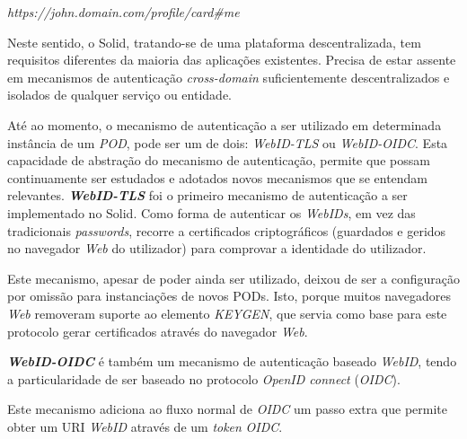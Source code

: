 \begin{center}
    \emph{https://john.domain.com/profile/card\#me}
\end{center}

Neste sentido, o Solid, tratando-se de uma plataforma descentralizada, tem requisitos diferentes da maioria das aplicações existentes. Precisa de estar assente em mecanismos de autenticação \emph{cross-domain} suficientemente descentralizados e isolados de qualquer serviço ou entidade\cite{solid_spec}.

Até ao momento, o mecanismo de autenticação a ser utilizado em determinada instância de um \emph{POD}, pode ser um de dois: \emph{WebID-TLS} ou \emph{WebID-OIDC}. Esta capacidade de abstração do mecanismo de autenticação, permite que possam continuamente ser estudados e adotados novos mecanismos que se entendam relevantes\cite{solid_spec}.
\newpara
\textbf{\emph{WebID-TLS}} foi o primeiro mecanismo de autenticação a ser implementado no Solid. Como forma de autenticar os \emph{WebIDs}, em vez das tradicionais \emph{passwords}, recorre a certificados criptográficos (guardados e geridos no navegador \emph{Web} do utilizador) para comprovar a identidade do utilizador\cite{solid_webid-tls:}.

Este mecanismo, apesar de poder ainda ser utilizado, deixou de ser a configuração por omissão para instanciações de novos PODs. Isto, porque muitos navegadores \emph{Web} removeram suporte ao elemento \emph{KEYGEN}, que servia como base para este protocolo gerar certificados através do navegador \emph{Web}\cite{solid_webid-tls:}.

\newpara
\textbf{\emph{WebID-OIDC}} é também um mecanismo de autenticação baseado \emph{WebID}, tendo a particularidade de ser baseado no protocolo \emph{OpenID connect} (\emph{OIDC}). 

Este mecanismo adiciona ao fluxo normal de \emph{OIDC} um passo extra que permite obter um URI \emph{WebID} através de um \emph{token} \emph{OIDC}\cite{solid_webid_oidc}.

